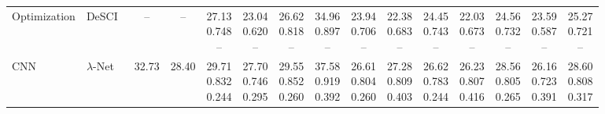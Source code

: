 \documentclass[letterpaper]{article} %
\begin{document}
\begin{table}[!t]
{\begin{tabular}{ll|cc|*{10}{c}|c}
Optimization & DeSCI~\cite{liu2018rank} & -- & -- & \makecell{27.13\\0.748\\--} & \makecell{23.04\\0.620\\--} & \makecell{26.62\\0.818\\--} & \makecell{34.96\\0.897\\--} & \makecell{23.94\\0.706\\--} & \makecell{22.38\\0.683\\--} & \makecell{24.45\\0.743\\--} & \makecell{22.03\\0.673\\--} & \makecell{24.56\\0.732\\--} & \makecell{23.59\\0.587\\--} & \makecell{25.27\\0.721\\--} \\
\rowcolor{costgray}
CNN & $\lambda$-Net~\cite{miao2019lambdanet} & 32.73 & 28.40 & \makecell{29.71\\0.832\\0.244} & \makecell{27.70\\0.746\\0.295} & \makecell{29.55\\0.852\\0.260} & \makecell{37.58\\0.919\\0.392} & \makecell{26.61\\0.804\\0.260} & \makecell{27.28\\0.809\\0.403} & \makecell{26.62\\0.783\\0.244} & \makecell{26.23\\0.807\\0.416} & \makecell{28.56\\0.805\\0.265} & \makecell{26.16\\0.723\\0.391} & \makecell{28.60\\0.808\\0.317} \\

\end{tabular}}
\end{table}
\end{document}
